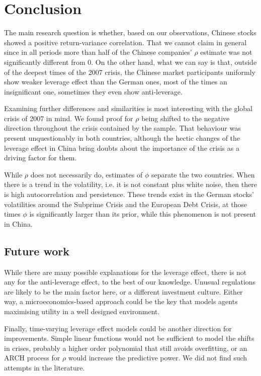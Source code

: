 \section{Conclusion}

The main research question is whether, based on our observations, Chinese stocks showed a positive return-variance correlation.
That we cannot claim in general since in all periods more than half of the Chinese companies' $\rho$ estimate was not significantly different from 0.
On the other hand, what we can say is that, outside of the deepest times of the 2007 crisis, the Chinese market participants uniformly show weaker leverage effect than the German ones, most of the times an insignificant one, sometimes they even show anti-leverage.

Examining further differences and similarities is most interesting with the global crisis of 2007 in mind.
We found proof for $\rho$ being shifted to the negative direction throughout the crisis contained by the sample.
That behaviour was present unquestionably in both countries, although the hectic changes of the leverage effect in China bring doubts about the importance of the crisis as a driving factor for them.

While $\rho$ does not necessarily do, estimates of $\phi$ separate the two countries.
When there is a trend in the volatility, i.e. it is not constant plus white noise, then there is high autocorrelation and persistence.
These trends exist in the German stocks' volatilities around the Subprime Crisis and the European Debt Crisis, at those times $\phi$ is significantly larger than its prior, while this phenomenon is not present in China.

\subsection{Future work}

While there are many possible explanations for the leverage effect, there is not any for the anti-leverage effect, to the best of our knowledge.
Unusual regulations are likely to be the main factor here, or a different investment culture.
Either way, a microeconomics-based approach could be the key that models agents maximising utility in a well designed environment.

Finally, time-varying leverage effect models could be another direction for improvements.
Simple linear functions would not be sufficient to model the shifts in crises, probably a higher order polynomial that still avoids overfitting, or an ARCH process for $\rho$ would increase the predictive power.
We did not find such attempts in the literature.

